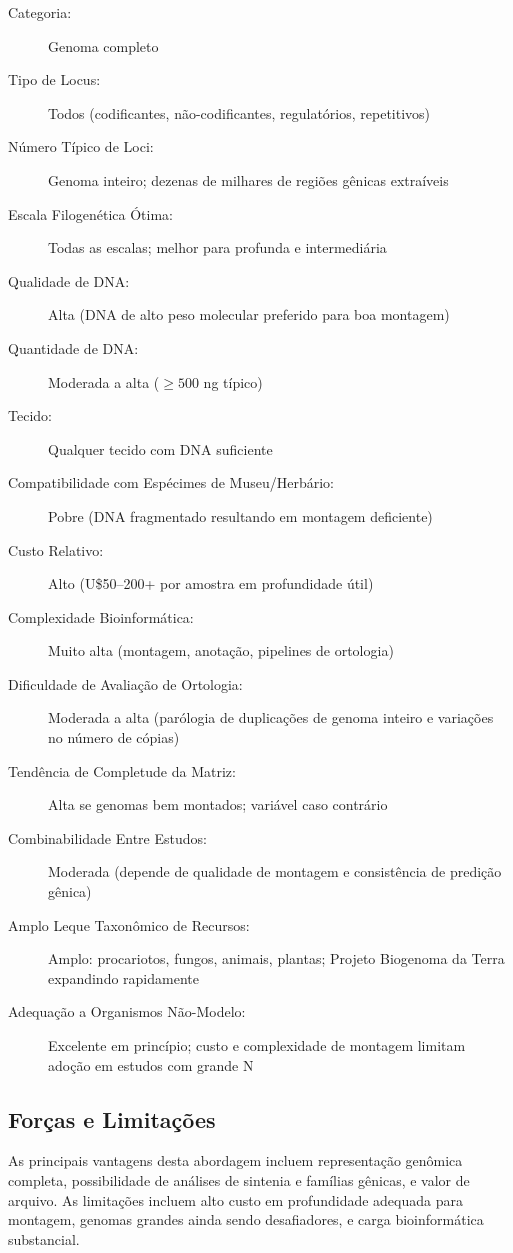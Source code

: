 \begin{description}
\item[Categoria:] Genoma completo
\item[Tipo de Locus:] Todos (codificantes, não-codificantes, regulatórios, repetitivos)
\item[Número Típico de Loci:] Genoma inteiro; dezenas de milhares de regiões gênicas extraíveis
\item[Escala Filogenética Ótima:] Todas as escalas; melhor para profunda e intermediária
\item[Qualidade de DNA:] Alta (DNA de alto peso molecular preferido para boa montagem)
\item[Quantidade de DNA:] Moderada a alta (\(\geq 500\) ng típico)
\item[Tecido:] Qualquer tecido com DNA suficiente
\item[Compatibilidade com Espécimes de Museu/Herbário:] Pobre (DNA fragmentado resultando em montagem deficiente)
\item[Custo Relativo:] Alto (U\$50--200+ por amostra em profundidade útil)
\item[Complexidade Bioinformática:] Muito alta (montagem, anotação, pipelines de ortologia)
\item[Dificuldade de Avaliação de Ortologia:] Moderada a alta (parólogia de duplicações de genoma inteiro e variações no número de cópias)
\item[Tendência de Completude da Matriz:] Alta se genomas bem montados; variável caso contrário
\item[Combinabilidade Entre Estudos:] Moderada (depende de qualidade de montagem e consistência de predição gênica)
\item[Amplo Leque Taxonômico de Recursos:] Amplo: procariotos, fungos, animais, plantas; Projeto Biogenoma da Terra expandindo rapidamente
\item[Adequação a Organismos Não-Modelo:] Excelente em princípio; custo e complexidade de montagem limitam adoção em estudos com grande N
\end{description}

\subsection{Forças e Limitações}

As principais vantagens desta abordagem incluem representação genômica completa, possibilidade de análises de sintenia e famílias gênicas, e valor de arquivo. As limitações incluem alto custo em profundidade adequada para montagem, genomas grandes ainda sendo desafiadores, e carga bioinformática substancial.

